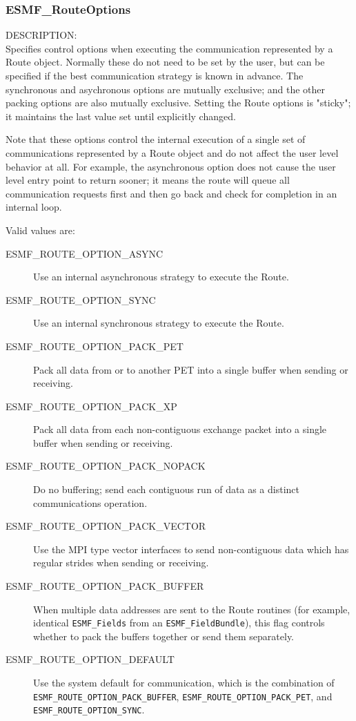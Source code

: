 
\subsubsection{ESMF\_RouteOptions}

\label{opt:routeopt}
{\sf DESCRIPTION:\\}
Specifies control options when executing the communication
represented by a Route object.  Normally these do not need to
be set by the user, but can be specified if the best communication strategy
is known in advance.   The synchronous and asychronous options 
are mutually exclusive; and the other packing options are also
mutually exclusive.  Setting the Route options is "sticky"; it
maintains the last value set until explicitly changed.

Note that these options control the internal execution of a single
set of communications represented by a Route object and do not affect
the user level behavior at all.  For example,
the asynchronous option does not cause the user level entry point to
return sooner; it means the route will queue all communication requests
first and then go back and check for completion in an internal loop.

Valid values are:
\begin{description}
    \item [ESMF\_ROUTE\_OPTION\_ASYNC]
	Use an internal asynchronous strategy to execute the Route.
    \item [ESMF\_ROUTE\_OPTION\_SYNC]
	Use an internal synchronous strategy to execute the Route.
    \item [ESMF\_ROUTE\_OPTION\_PACK\_PET]
        Pack all data from or to another PET into a single buffer
        when sending or receiving.
    \item [ESMF\_ROUTE\_OPTION\_PACK\_XP]
        Pack all data from each non-contiguous exchange packet 
        into a single buffer when sending or receiving.
    \item [ESMF\_ROUTE\_OPTION\_PACK\_NOPACK]
        Do no buffering; send each contiguous run of data as a distinct
        communications operation.
    \item [ESMF\_ROUTE\_OPTION\_PACK\_VECTOR]
        Use the MPI type vector interfaces to send non-contiguous data
        which has regular strides when sending or receiving.
    \item [ESMF\_ROUTE\_OPTION\_PACK\_BUFFER]
        When multiple data addresses are sent to the Route routines (for
        example, identical {\tt ESMF\_Fields} from an {\tt ESMF\_FieldBundle}),
        this flag controls whether to pack the buffers together or send
        them separately.  
    \item [ESMF\_ROUTE\_OPTION\_DEFAULT]
	Use the system default for communication, which is the combination of 
        {\tt ESMF\_ROUTE\_OPTION\_PACK\_BUFFER},
        {\tt ESMF\_ROUTE\_OPTION\_PACK\_PET}, and
        {\tt ESMF\_ROUTE\_OPTION\_SYNC}.
\end{description}







